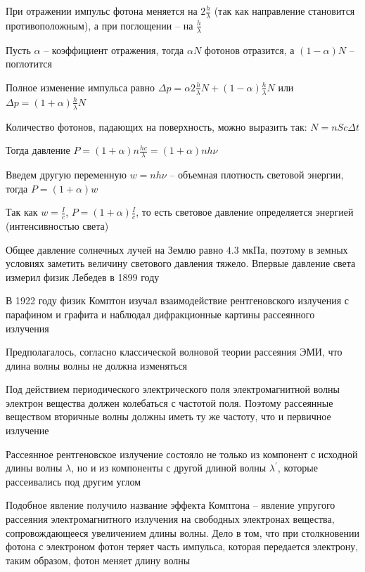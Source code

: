 \documentclass[12pt]{article}
\begin{document}
При отражении импульс фотона меняется на $2 \frac{h}{\lambda}$ (так как направление становится противоположным), а при поглощении -- на $\frac{h}{\lambda}$

Пусть $\alpha$ -- коэффициент отражения, тогда $\alpha N$ фотонов отразится, а $(1 - \alpha) N$ -- поглотится

Полное изменение импульса равно $\Delta p = \alpha 2\frac{h}{\lambda} N + (1 - \alpha) \frac{h}{\lambda} N$ или $\Delta p = (1 + \alpha) \frac{h}{\lambda} N$

Количество фотонов, падающих на поверхность, можно выразить так: $N = n S c \Delta t$

Тогда давление $P = (1 + \alpha) n \frac{h c}{\lambda} = (1 + \alpha) n h \nu$

Введем другую переменную $w = n h \nu$ -- объемная плотность световой энергии, тогда $P = (1 + \alpha) w$

Так как $w = \frac{I}{c}$, $P = (1 + \alpha) \frac{I}{c}$, то есть световое давление определяется энергией (интенсивностью света)

Общее давление солнечных лучей на Землю равно $4.3$ мкПа, поэтому в земных условиях заметить величину светового давления тяжело. Впервые давление света измерил физик Лебедев в 1899 году

\mediumvspace

В 1922 году физик Комптон изучал взаимодействие рентгеновского излучения с парафином и графита и наблюдал дифракционные картины рассеянного излучения

Предполагалось, согласно классической волновой теории рассеяния ЭМИ, что длина волны волны не должна изменяться

Под действием периодического электрического поля электромагнитной волны электрон вещества должен колебаться с частотой поля. Поэтому рассеянные веществом вторичные волны должны иметь ту же частоту, что и первичное излучение


Рассеянное рентгеновское излучение состояло не только из компонент с исходной длины волны $\lambda$, но и из компоненты с другой длиной волны $\lambda^\prime$, которые рассеивались под другим углом

Подобное явление получило название эффекта Комптона -- явление упругого рассеяния электромагнитного излучения на свободных электронах вещества, сопровождающееся увеличением длины волны. Дело в том, что при столкновении фотона с электроном фотон теряет часть импульса, которая передается электрону, таким образом, фотон меняет длину волны
\end{document}
